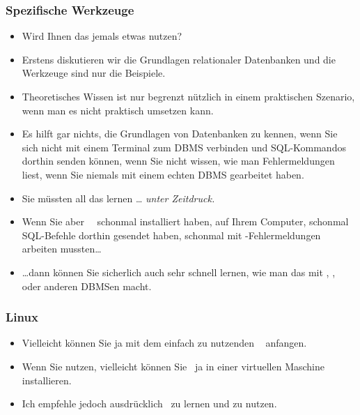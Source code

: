 \documentclass[aspectratio=169,mathserif,notheorems]{beamer}%
\begin{document}
%
\begin{frame}%
\frametitle{Spezifische Werkzeuge}%
\begin{itemize}%
\item Wird Ihnen das jemals etwas nutzen?%
\item<3-> Erstens diskutieren wir die Grundlagen relationaler Datenbanken und die Werkzeuge sind nur die Beispiele.%
\item<4-> Theoretisches Wissen ist nur begrenzt nützlich in einem praktischen Szenario, wenn man es nicht praktisch umsetzen kann.%
\item<5-> Es hilft gar nichts, die Grundlagen von Datenbanken zu kennen, wenn Sie sich nicht mit einem Terminal zum DBMS verbinden und SQL-Kommandos dorthin senden können, wenn Sie nicht wissen, wie man Fehlermeldungen liest, wenn Sie niemals mit einem echten DBMS gearbeitet haben.%
\item<6-> Sie müssten all das lernen {\dots} \emph{unter Zeitdruck.}%
\item<7-> Wenn Sie aber \DEzB\ \postgresql\ schonmal installiert haben, auf Ihrem Computer, schonmal SQL-Befehle dorthin gesendet haben, schonmal mit \postgresql-Fehlermeldungen arbeiten mussten\dots%
\item<8-> {\dots}dann können Sie sicherlich auch sehr schnell lernen, wie man das mit \mysql, \mariadb, oder anderen DBMSen macht.%
\end{itemize}%
\end{frame}%
%
\begin{frame}%
\frametitle{Linux}%
%
%
\begin{itemize}%
\item Vielleicht können Sie ja mit dem einfach zu nutzenden \ubuntu\ \linux\cite{CN2020ULB,H2020ULU2E} anfangen.%
\item<2-> Wenn Sie \microsoftWindows\cite{B2023W1IO} nutzen, vielleicht können Sie \ubuntu\ ja in einer virtuellen Maschine installieren.%
\item<3-> Ich empfehle jedoch ausdrücklich \linux\ zu lernen und zu nutzen.%
\end{itemize}%
\end{frame}%
%
\end{document}
